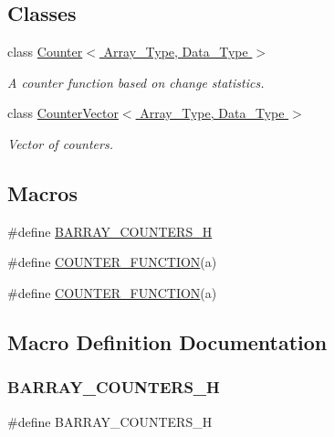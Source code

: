 \subsection*{Classes}
\begin{DoxyCompactItemize}
\item 
class \hyperlink{class_counter}{Counter$<$ Array\+\_\+\+Type, Data\+\_\+\+Type $>$}
\begin{DoxyCompactList}\small\item\em A counter function based on change statistics. \end{DoxyCompactList}\item 
class \hyperlink{class_counter_vector}{Counter\+Vector$<$ Array\+\_\+\+Type, Data\+\_\+\+Type $>$}
\begin{DoxyCompactList}\small\item\em Vector of counters. \end{DoxyCompactList}\end{DoxyCompactItemize}
\subsection*{Macros}
\begin{DoxyCompactItemize}
\item 
\#define \hyperlink{barry_8hpp_a6c60a358a2b89973d5d4b9436374ef8b}{B\+A\+R\+R\+A\+Y\+\_\+\+C\+O\+U\+N\+T\+E\+R\+S\+\_\+H}
\item 
\#define \hyperlink{barry_8hpp_ae7fbc217bad33cff559b1fc41375a8ff}{C\+O\+U\+N\+T\+E\+R\+\_\+\+F\+U\+N\+C\+T\+I\+ON}(a)
\item 
\#define \hyperlink{counters-bones_8hpp_ae7fbc217bad33cff559b1fc41375a8ff}{C\+O\+U\+N\+T\+E\+R\+\_\+\+F\+U\+N\+C\+T\+I\+ON}(a)
\end{DoxyCompactItemize}


\subsection{Macro Definition Documentation}
\mbox{\label{barry_8hpp_a6c60a358a2b89973d5d4b9436374ef8b}} 
\subsubsection{\texorpdfstring{B\+A\+R\+R\+A\+Y\+\_\+\+C\+O\+U\+N\+T\+E\+R\+S\+\_\+H}{BARRAY\_COUNTERS\_H}}
{\footnotesize\ttfamily \#define B\+A\+R\+R\+A\+Y\+\_\+\+C\+O\+U\+N\+T\+E\+R\+S\+\_\+H}



